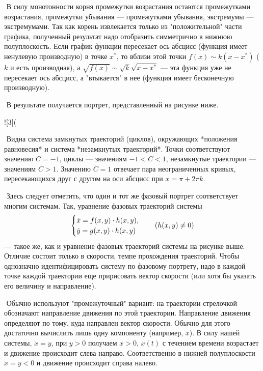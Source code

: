 ​	В силу монотонности корня промежутки возрастания остаются промежутками возрастания, промежутки убывания — промежутками убывания, экстремумы — экстремумами. Так как корень извлекается только из "положительной" части графика, полученный результат надо отобразить симметрично в нижнюю полуплоскость. Если график функции пересекает ось абсцисс (функция имеет ненулевую производную) в точке $x^*$, то вблизи этой точки $f(x) \sim k(x - x^*)$ ($k$ и есть производная), а $\sqrt{f(x)} \sim \sqrt{k}\sqrt{x - x^*}$ — эта функция уже не пересекает ось абсцисс, а "втыкается" в нее (функция имеет бесконечную производную).

​	В результате получается портрет, представленный на рисунке ниже.

![3](%

​	Видна система замкнутых траекторий (циклов), окружающих *положения равновесия* и система *незамкнутых траекторий*. Точки соответствуют значению $C = -1$, циклы — значениям $-1 < C < 1$, незамкнутые траектории — значениям $C > 1.$ Значению $C = 1$ отвечает пара неограниченных кривых, пересекающихся друг с другом на оси абсцисс при $x = \pi + 2\pi k$.

​	Здесь следует отметить, что один и тот же фазовый портрет соответствует многим системам. Так, уравнение фазовых траекторий системы
$$
\begin{equation*}
 \begin{cases}
   \dot x = f(x,y) \cdot h(x,y), 
   \\
   \dot y = g(x,y) \cdot h(x,y)
 \end{cases}
 \\
 \quad (h(x,y) \neq 0)
\end{equation*}
$$
— такое же, как и уравнение фазовых траекторий системы на рисунке выше. Отличие состоит только в скорости, темпе прохождения траекторий. Чтобы однозначно идентифицировать систему по фазовому портрету, надо в каждой точке каждой траектории еще пририсовать вектор скорости (или хотя бы указать его величину и направление).

​	Обычно используют "промежуточный" вариант: на траектории стрелочкой обозначают направление движения по этой траектории. Направление движения определяют по тому, куда направлен вектор скорости. Обычно для этого достаточно вычислить лишь одну компоненту (например, $\dot x$). В силу нашей системы, $\dot x = y$, при $y > 0$ получаем $x > 0$, $x(t)$ с течением времени возрастает и движение происходит слева направо. Соответственно в нижней полуплоскости $\dot x = y < 0$ и движение происходит справа налево.

